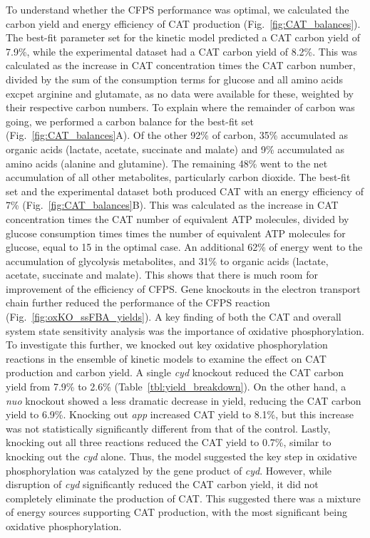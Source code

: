 \documentclass[12pt]{article}
\begin{document}
To understand whether the CFPS performance was optimal, we calculated the carbon yield and energy efficiency of CAT production (Fig.~\ref{fig:CAT_balances}).
The best-fit parameter set for the kinetic model predicted a CAT carbon yield of 7.9\%, while the experimental dataset had a CAT carbon yield of 8.2\%.
This was calculated as the increase in CAT concentration times the CAT carbon number, divided by the sum of the consumption terms for glucose and all amino acids excpet arginine and glutamate, as no data were available for these, weighted by their respective carbon numbers.
To explain where the remainder of carbon was going, we performed a carbon balance for the best-fit set (Fig.~\ref{fig:CAT_balances}A).
Of the other 92\% of carbon, 35\% accumulated as organic acids (lactate, acetate, succinate and malate) and 9\% accumulated as amino acids (alanine and glutamine).
The remaining 48\% went to the net accumulation of all other metabolites, particularly carbon dioxide.
The best-fit set and the experimental dataset both produced CAT with an energy efficiency of 7\% (Fig.~\ref{fig:CAT_balances}B).
This was calculated as the increase in CAT concentration times the CAT number of equivalent ATP molecules, divided by glucose consumption times times the number of equivalent ATP molecules for glucose, equal to 15 in the optimal case.
An additional 62\% of energy went to the accumulation of glycolysis metabolites, and 31\% to organic acids (lactate, acetate, succinate and malate).
This shows that there is much room for improvement of the efficiency of CFPS.
Gene knockouts in the electron transport chain further reduced the performance of the CFPS reaction (Fig.~\ref{fig:oxKO_ssFBA_yields}).
A key finding of both the CAT and overall system state sensitivity analysis was the importance of oxidative phosphorylation.
To investigate this further, we knocked out key oxidative phosphorylation reactions in the ensemble of kinetic models to examine the effect on CAT production and carbon yield.
A single \textit{cyd} knockout reduced the CAT carbon yield from 7.9\% to 2.6\% (Table~\ref{tbl:yield_breakdown}).
On the other hand, a \textit{nuo} knockout showed a less dramatic decrease in yield,
reducing the CAT carbon yield to 6.9\%.
Knocking out \textit{app} increased CAT yield to 8.1\%, but this increase was not statistically significantly different from that of the control.
Lastly, knocking out all three reactions reduced the CAT yield to 0.7\%, similar to knocking out the \textit{cyd} alone.
Thus, the model suggested the key step in oxidative phosphorylation was catalyzed by the gene product of \textit{cyd}.
However, while disruption of \textit{cyd} significantly reduced the CAT carbon yield, it did not completely eliminate the production of CAT.
This suggested there was a mixture of energy sources supporting CAT production, with the most significant being oxidative phosphorylation.
\end{document}
